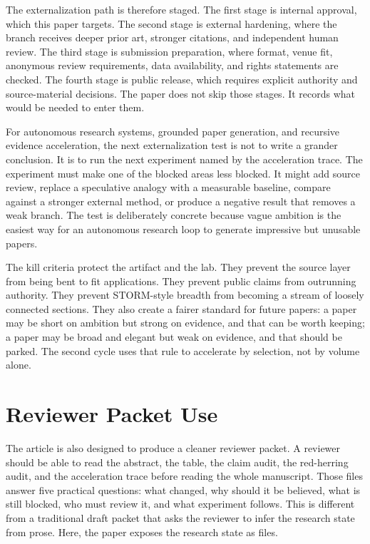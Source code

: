 \documentclass[sigconf,nonacm]{acmart}
\begin{document}
The externalization path is therefore staged. The first stage is internal
approval, which this paper targets. The second stage is external hardening, where
the branch receives deeper prior art, stronger citations, and independent human
review. The third stage is submission preparation, where format, venue fit,
anonymous review requirements, data availability, and rights statements are
checked. The fourth stage is public release, which requires explicit authority
and source-material decisions. The paper does not skip those stages. It records
what would be needed to enter them.

For autonomous research systems, grounded paper generation, and recursive evidence acceleration, the next externalization test is not to write a grander conclusion.
It is to run the next experiment named by the acceleration trace. The experiment
must make one of the blocked areas less blocked. It might add source review,
replace a speculative analogy with a measurable baseline, compare against a
stronger external method, or produce a negative result that removes a weak
branch. The test is deliberately concrete because vague ambition is the easiest
way for an autonomous research loop to generate impressive but unusable papers.

The kill criteria protect the artifact and the lab. They prevent the source
layer from being bent to fit applications. They prevent public claims from
outrunning authority. They prevent STORM-style breadth from becoming a stream of
loosely connected sections. They also create a fairer standard for future
papers: a paper may be short on ambition but strong on evidence, and that can be
worth keeping; a paper may be broad and elegant but weak on evidence, and that
should be parked. The second cycle uses that rule to accelerate by selection,
not by volume alone.

\section{Reviewer Packet Use}
The article is also designed to produce a cleaner reviewer packet. A reviewer
should be able to read the abstract, the table, the claim audit, the red-herring
audit, and the acceleration trace before reading the whole manuscript. Those
files answer five practical questions: what changed, why should it be believed,
what is still blocked, who must review it, and what experiment follows. This is
different from a traditional draft packet that asks the reviewer to infer the
research state from prose. Here, the paper exposes the research state as files.
\end{document}
